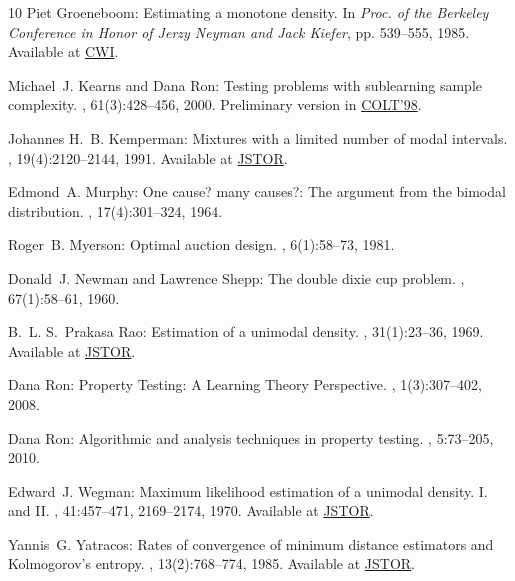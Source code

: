 \begin{thebibliography}{10}
{\sc Piet Groeneboom}: Estimating a monotone density.
\newblock In {\em Proc. of the Berkeley Conference in Honor of Jerzy Neyman and
  Jack Kiefer}, pp. 539--555, 1985.
\newblock Available at
  \href{http://persistent-identifier.org/?identifier=urn:nbn:nl:ui:18-6537}{CWI}.

{\sc Michael~J. Kearns and Dana Ron}: Testing problems with sublearning sample
  complexity.
, 61(3):428--456, 2000.
\newblock Preliminary version in
  \href{http://dx.doi.org/10.1145/279943.279996}{COLT'98}.

{\sc Johannes H.~B. Kemperman}: Mixtures with a limited number of modal
  intervals.
, 19(4):2120--2144, 1991.
\newblock Available at \href{http://www.jstor.org/stable/2241922}{JSTOR}.

{\sc Edmond~A. Murphy}: One cause? many causes?: The argument from the bimodal
  distribution.
, 17(4):301--324, 1964.
\newblock [\epfmtdoi{10.1016/0021-9681(64)90073-6}]

{\sc Roger~B. Myerson}: Optimal auction design.
, 6(1):58--73, 1981.

{\sc Donald~J. Newman and Lawrence Shepp}: The double dixie cup problem.
, 67(1):58--61, 1960.
\newblock [\epfmtdoi{10.2307/2308930}]

{\sc B.~L. S.~Prakasa Rao}: Estimation of a unimodal density.
, 31(1):23--36, 1969.
\newblock Available at \href{http://www.jstor.org/stable/25049557}{JSTOR}.

{\sc Dana Ron}: {Property Testing: A Learning Theory Perspective}.
, 1(3):307--402,
  2008.
\newblock [\epfmtdoi{10.1561/2200000004}]

{\sc Dana Ron}: Algorithmic and analysis techniques in property testing.
,
  5:73--205, 2010.
\newblock [\epfmtdoi{10.1561/0400000029}]

{\sc Edward~J. Wegman}: {Maximum likelihood estimation of a unimodal density.
  I. and II.}
, 41:457--471, 2169--2174, 1970.
\newblock Available at \href{http://www.jstor.org/stable/2240361}{JSTOR}.

{\sc Yannis~G. Yatracos}: Rates of convergence of minimum distance estimators
  and {K}olmogorov{'}s entropy.
, 13(2):768--774, 1985.
\newblock Available at \href{http://www.jstor.org/stable/2241209}{JSTOR}.

\end{thebibliography}
